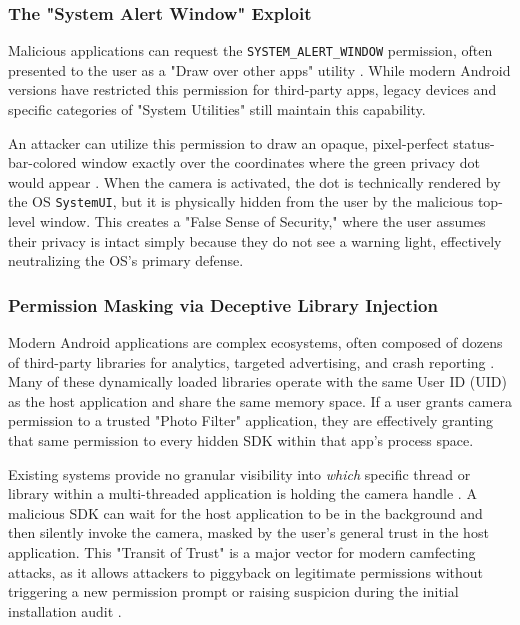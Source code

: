 \documentclass[12pt,a4paper]{report}
\begin{document}
\begin{enumerate}
    \subsubsection{The "System Alert Window" Exploit}
    Malicious applications can request the \texttt{SYSTEM\_ALERT\_WINDOW} permission, often presented to the user as a "Draw over other apps" utility \cite{checkmarx}. While modern Android versions have restricted this permission for third-party apps, legacy devices and specific categories of "System Utilities" still maintain this capability.

    An attacker can utilize this permission to draw an opaque, pixel-perfect status-bar-colored window exactly over the coordinates where the green privacy dot would appear \cite{privacydot}. When the camera is activated, the dot is technically rendered by the OS \texttt{SystemUI}, but it is physically hidden from the user by the malicious top-level window. This creates a "False Sense of Security," where the user assumes their privacy is intact simply because they do not see a warning light, effectively neutralizing the OS's primary defense.

    \subsubsection{Permission Masking via Deceptive Library Injection}
    Modern Android applications are complex ecosystems, often composed of dozens of third-party libraries for analytics, targeted advertising, and crash reporting \cite{taintdroid}. Many of these dynamically loaded libraries operate with the same User ID (UID) as the host application and share the same memory space. If a user grants camera permission to a trusted "Photo Filter" application, they are effectively granting that same permission to every hidden SDK within that app's process space.

    Existing systems provide no granular visibility into \textit{which} specific thread or library within a multi-threaded application is holding the camera handle \cite{taintdroid}. A malicious SDK can wait for the host application to be in the background and then silently invoke the camera, masked by the user's general trust in the host application. This "Transit of Trust" is a major vector for modern camfecting attacks, as it allows attackers to piggyback on legitimate permissions without triggering a new permission prompt or raising suspicion during the initial installation audit \cite{malwaresurvey}.


\end{enumerate}
\end{document}
